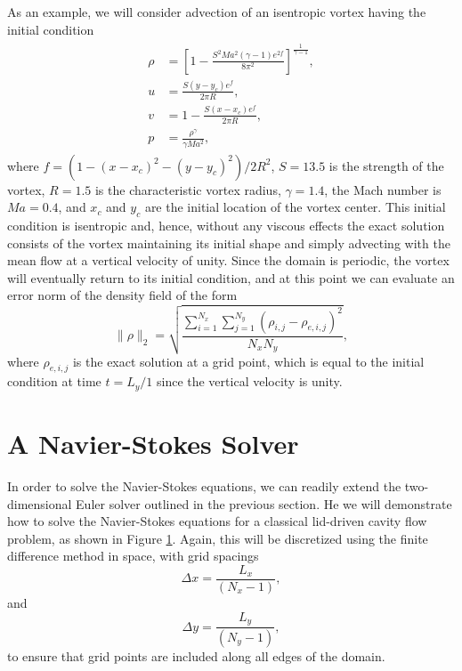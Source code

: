 As an example, we will consider advection of an isentropic vortex having the initial condition
\begin{eqnarray}
\begin{split}
\rho & = \left[1-\frac{S^2Ma^2(\gamma-1)e^{2f}}{8\pi^2}\right]^{\frac{1}{\gamma-1}},\\
u& = \frac{S(y-y_c)e^f}{2\pi R},\\
v& = 1-\frac{S(x-x_c)e^f}{2\pi R},\\
p& = \frac{\rho^\gamma}{\gamma Ma^2},
\end{split}
\end{eqnarray}
where $f = (1-(x-x_c)^2-(y-y_c)^2)/2R^2$, $S = 13.5$ is the strength of the vortex, $R=1.5$ is the characteristic vortex radius, $\gamma = 1.4$, the Mach number is $Ma = 0.4$, and $x_c$ and $y_c$ are the initial location of the vortex center. This initial condition is isentropic and, hence, without any viscous effects the exact solution consists of the vortex maintaining its initial shape and simply advecting with the mean flow at a vertical velocity of unity. Since the domain is periodic, the vortex will eventually return to its initial condition, and at this point we can evaluate an error norm of the density field of the form
\begin{equation}
	\| \rho \|_2 = \sqrt{\frac{\sum_{i=1}^{N_x} \sum_{j=1}^{N_y} \left(\rho_{i,j} - \rho_{e,i,j}\right)^2}{N_x N_y}},
\end{equation}
where $\rho_{e,i,j}$ is the exact solution at a grid point, which is equal to the initial condition at time $t = L_y/1$ since the vertical velocity is unity.

\section{A Navier-Stokes Solver}
In order to solve the Navier-Stokes equations, we can readily extend the two-dimensional Euler solver outlined in the previous section. He we will demonstrate how to solve the Navier-Stokes equations for a classical lid-driven cavity flow problem, as shown in Figure \ref{}. Again, this will be discretized using the finite difference method in space, with grid spacings
\begin{equation}
	\Delta x = \frac{L_x}{(N_x-1)},
\end{equation}
and
\begin{equation}
	\Delta y = \frac{L_y}{(N_y-1)},
\end{equation}
to ensure that grid points are included along all edges of the domain.

